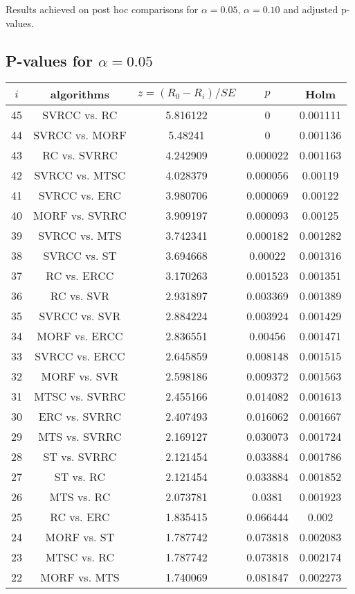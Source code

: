 \documentclass[a4paper,10pt]{article}
\begin{document}
\begin{landscape}
Results achieved on post hoc comparisons for $\alpha = 0.05$, $\alpha = 0.10$ and adjusted p-values.

\subsection{P-values for $\alpha=0.05$}

\begin{table}[!htp]
\centering\scriptsize
\begin{tabular}{ccccc}
$i$&algorithms&$z=(R_0 - R_i)/SE$&$p$&Holm\\
\hline45&SVRCC vs. RC&5.816122&0&0.001111\\
44&SVRCC vs. MORF&5.48241&0&0.001136\\
43&RC vs. SVRRC&4.242909&0.000022&0.001163\\
42&SVRCC vs. MTSC&4.028379&0.000056&0.00119\\
41&SVRCC vs. ERC&3.980706&0.000069&0.00122\\
40&MORF vs. SVRRC&3.909197&0.000093&0.00125\\
39&SVRCC vs. MTS&3.742341&0.000182&0.001282\\
38&SVRCC vs. ST&3.694668&0.00022&0.001316\\
37&RC vs. ERCC&3.170263&0.001523&0.001351\\
36&RC vs. SVR&2.931897&0.003369&0.001389\\
35&SVRCC vs. SVR&2.884224&0.003924&0.001429\\
34&MORF vs. ERCC&2.836551&0.00456&0.001471\\
33&SVRCC vs. ERCC&2.645859&0.008148&0.001515\\
32&MORF vs. SVR&2.598186&0.009372&0.001563\\
31&MTSC vs. SVRRC&2.455166&0.014082&0.001613\\
30&ERC vs. SVRRC&2.407493&0.016062&0.001667\\
29&MTS vs. SVRRC&2.169127&0.030073&0.001724\\
28&ST vs. SVRRC&2.121454&0.033884&0.001786\\
27&ST vs. RC&2.121454&0.033884&0.001852\\
26&MTS vs. RC&2.073781&0.0381&0.001923\\
25&RC vs. ERC&1.835415&0.066444&0.002\\
24&MORF vs. ST&1.787742&0.073818&0.002083\\
23&MTSC vs. RC&1.787742&0.073818&0.002174\\
22&MORF vs. MTS&1.740069&0.081847&0.002273\\

\end{tabular}
\end{table}
\end{landscape}
\end{document}
